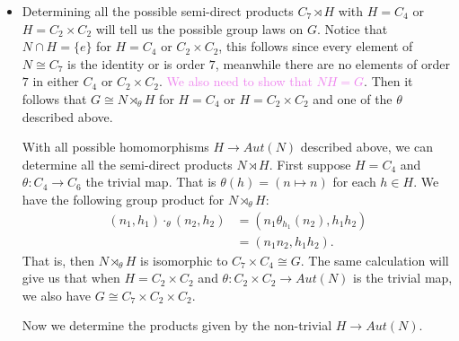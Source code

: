 \documentclass[12pt,letterpaper,boxed]{hmcpset}
\newcommand{\wg}[1]{\textcolor{violet}{#1}}
\begin{document}
\begin{solution}
\begin{itemize}
\item Determining all the possible semi-direct products $C_7 \rtimes
H$ with $H = C_4$ or $H = C_2 \times C_2$ will tell us the possible
group laws on $G$. Notice that $N \cap H = \{e \}$ for $H = C_4$ or
$C_2 \times C_2$, this follows since every element of $N \cong C_7$ is
the identity or is order $7$, meanwhile there are no elements of order
$7$ in either $C_4$ or $C_2 \times C_2$. 
\wg{We also need to show that $NH = G$}. 
Then it follows that $G \cong N \rtimes_\theta H$ for $H = C_4$ or $H
= C_2 \times C_2$ and one of the $\theta$ described above.

With all possible homomorphisms $H \to Aut(N)$ described above,
we can determine all the semi-direct products $N \rtimes H$.
First suppose $H = C_4$ and $\theta : C_4 \to C_6$ the trivial map.
That is $\theta(h) = (n \mapsto n)$ for each $h \in H$. We have the
following group product for $N \rtimes_\theta H$:
\begin{align*}
	(n_1, h_1) \cdot_\theta (n_2, h_2) 
		&= (n_1 \theta_{h_1}(n_2), h_1 h_2) \\
		&= (n_1 n_2, h_1 h_2).
\end{align*}
That is, then $N \rtimes_\theta H$ is isomorphic to $C_7 \times C_4
\cong G$.
The same calculation will give us that when $H = C_2 \times C_2$ and
$\theta : C_2 \times C_2 \to Aut(N)$ is the trivial map, we also have
$G \cong C_7 \times C_2 \times C_2$. 

Now we determine the products given by the non-trivial $H \to Aut(N)$.


\end{itemize}
\end{solution}

\newpage

\begin{problem}[4]
	\hfill
\end{problem}

\begin{solution}
\end{solution}

\newpage


\begin{problem}[4]
	\hfill
\end{problem}

\begin{solution}
\end{solution}
\end{document}
